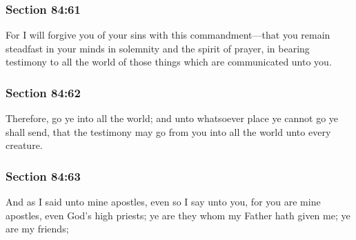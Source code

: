 	\subsubsection{Section 84:61} %
		\label{DC84-61}

		For I will forgive you of your sins with this commandment---that you remain steadfast in your minds in solemnity and the spirit of prayer, in bearing testimony to all the world of those things which are communicated unto you.


	\subsubsection{Section 84:62} %
		\label{DC84-62}

		Therefore, go ye into all the world; and unto whatsoever place ye cannot go ye shall send, that the testimony may go from you into all the world unto every creature.


	\subsubsection{Section 84:63} %
		\label{DC84-63}

		And as I said unto mine apostles, even so I say unto you, for you are mine apostles, even God's high priests; ye are they whom my Father hath given me; ye are my friends;


